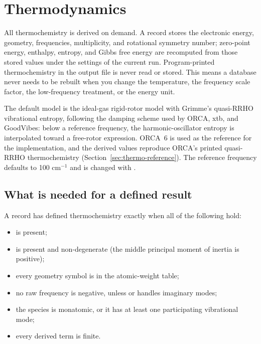 \section{Thermodynamics}\label{sec:thermo}

All thermochemistry is derived on demand. A record stores the electronic
energy, geometry, frequencies, multiplicity, and rotational symmetry number;
zero-point energy, enthalpy, entropy, and Gibbs free energy are recomputed
from those stored values under the settings of the current run. Program-printed
thermochemistry in the output file is never read or stored. This means a
database never needs to be rebuilt when you change the temperature, the
frequency scale factor, the low-frequency treatment, or the energy unit.

The default model is the ideal-gas rigid-rotor model with Grimme's
quasi-RRHO vibrational entropy, following the damping scheme used by ORCA,
xtb, and GoodVibes: below a reference frequency, the harmonic-oscillator
entropy is interpolated toward a free-rotor expression. ORCA~6 is used as the
reference for the implementation, and the derived values reproduce ORCA's
printed quasi-RRHO thermochemistry (Section~\ref{sec:thermo-reference}). The
reference frequency defaults to 100 cm$^{-1}$ and is changed with
.

\subsection{What is needed for a defined result}\label{sec:definedness}

A record has defined thermochemistry exactly when all of the following hold:

\begin{itemize}
  \item {} is present;
  \item {} is present and non-degenerate (the middle principal
        moment of inertia is positive);
  \item every geometry symbol is in the atomic-weight table;
  \item no raw frequency is negative, unless  or
         handles imaginary modes;
  \item the species is monatomic, or it has at least one participating
        vibrational mode;
  \item every derived term is finite.
\end{itemize}


